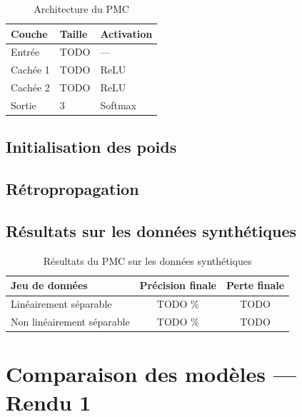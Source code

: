 \documentclass[12pt, a4paper]{report}
\begin{document}

\begin{table}[H]
\centering
\begin{tabular}{lll}
\toprule
\textbf{Couche} & \textbf{Taille} & \textbf{Activation} \\
\midrule
Entrée & TODO & — \\
Cachée 1 & TODO & ReLU \\
Cachée 2 & TODO & ReLU \\
Sortie & 3 & Softmax \\
\bottomrule
\end{tabular}
\caption{Architecture du PMC}
\end{table}

\subsection{Initialisation des poids}


\subsection{Rétropropagation}


\subsection{Résultats sur les données synthétiques}


\begin{table}[H]
\centering
\begin{tabular}{lcc}
\toprule
\textbf{Jeu de données} & \textbf{Précision finale} & \textbf{Perte finale} \\
\midrule
Linéairement séparable & TODO \% & TODO \\
Non linéairement séparable & TODO \% & TODO \\
\bottomrule
\end{tabular}
\caption{Résultats du PMC sur les données synthétiques}
\end{table}

\section{Comparaison des modèles — Rendu 1}
\end{document}
